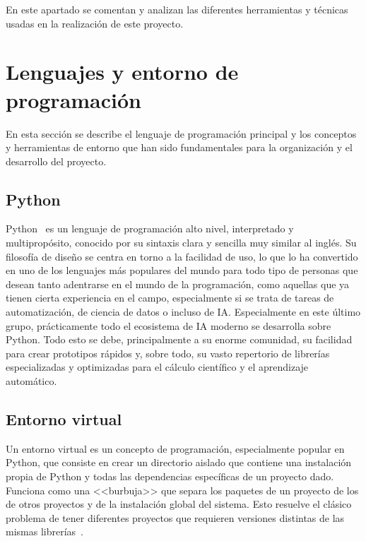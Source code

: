 
En este apartado se comentan y analizan las diferentes herramientas y técnicas usadas en la realización de este proyecto.

\section{Lenguajes y entorno de programación}

En esta sección se describe el lenguaje de programación principal y los conceptos y herramientas de entorno que han sido fundamentales para la organización y el desarrollo del proyecto.

\subsection{Python}


Python~\cite{python31112Documentation} es un lenguaje de programación alto nivel, interpretado y multipropósito, conocido por su sintaxis clara y sencilla muy similar al inglés. Su filosofía de diseño se centra en torno a la facilidad de uso, lo que lo ha convertido en uno de los lenguajes más populares del mundo para todo tipo de personas que desean tanto adentrarse en el mundo de la programación, como aquellas que ya tienen cierta experiencia en el campo, especialmente si se trata de tareas de automatización, de ciencia de datos o incluso de IA. Especialmente en este último grupo, prácticamente todo el ecosistema de IA moderno se desarrolla sobre Python. Todo esto se debe, principalmente a su enorme comunidad, su facilidad para crear prototipos rápidos y, sobre todo, su vasto repertorio de librerías especializadas y optimizadas para el cálculo científico y el aprendizaje automático.

\subsection{Entorno virtual}


Un entorno virtual es un concepto de programación, especialmente popular en Python, que consiste en crear un directorio aislado que contiene una instalación propia de Python y todas las dependencias específicas de un proyecto dado. Funciona como una <<burbuja>> que separa los paquetes de un proyecto de los de otros proyectos y de la instalación global del sistema. Esto resuelve el clásico problema de tener diferentes proyectos que requieren versiones distintas de las mismas librerías~\cite{pythonPythonVirtual}.

